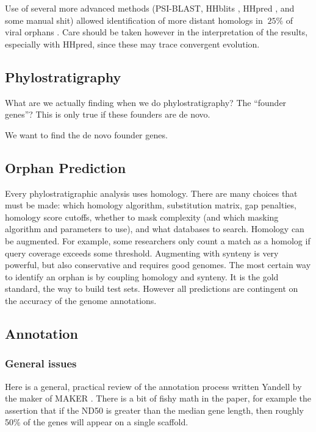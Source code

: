Use of several more advanced methods (PSI-BLAST, HHblits
\cite{remmert_hhblits:_2011}, HHpred \cite{hildebrand_fast_2009}, and some
manual shit) allowed identification of more distant homologs in $~25\%$ of
viral orphans \cite{kuchibhatla_powerful_2013}. Care should be taken however in
the interpretation of the results, especially with HHpred, since these may trace
convergent evolution.

\subsection{Phylostratigraphy}

What are we actually finding when we do phylostratigraphy? The ``founder
genes''? This is only true if these founders are de novo.

We want to find the de novo founder genes.

\subsection{Orphan Prediction}

Every phylostratigraphic analysis uses homology. There are many choices that
must be made: which homology algorithm, substitution matrix, gap penalties,
homology score cutoffs, whether to mask complexity (and which masking algorithm
and parameters to use), and what databases to search. Homology can be
augmented. For example, some researchers only count a match as a homolog if
query coverage exceeds some threshold. Augmenting with synteny is very
powerful, but also conservative and requires good genomes. The most certain way
to identify an orphan is by coupling homology and synteny. It is the gold
standard, the way to build test sets. However all predictions are contingent on
the accuracy of the genome annotations.

\subsection{Annotation}
\subsubsection{General issues}

  Here is a general, practical review of the annotation process written Yandell
  by the maker of MAKER \cite{yandell_beginners_2012}. There is a bit of fishy
  math in the paper, for example the assertion that if the ND50 is greater than
  the median gene length, then roughly 50\% of the genes will appear on a
  single scaffold.
  
